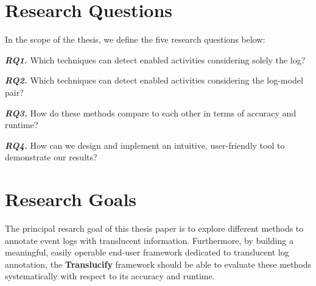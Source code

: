 \section{Research Questions}

\begin{comment}

In the context of our example, we can define many relevant research questions:
\begin{enumerate}
	\item What are typical prominent noise patterns in real event data?
	\item How to detect noise patterns in event data?
	\item How to detect infrequent behavior in event data?
	\item How to detect contextually different executions of the same activity?
	\item How to balance between detected noise patterns, infrequent behavior and imprecise labels?
	\item 
\end{enumerate}
Typically, your thesis consists of 3-5 research questions (often multiple more questions can be defined).
\end{comment}

In the scope of the thesis, we define the five research questions below: 

\textbf{\emph{RQ1.}} Which techniques can detect enabled activities considering solely the log?

\textbf{\emph{RQ2.}} Which techniques can detect enabled activities considering the log-model pair?

\textbf{\emph{RQ3.}} How do these methods compare to each other in terms of accuracy and runtime?

\textbf{\emph{RQ4.}} How can we design and implement an intuitive, user-friendly tool to demonstrate our results?


\section{Research Goals}

The principal resarch goal of this thesis paper is to explore different methods to annotate event logs with translucent information. Furthermore, by building a meaningful, easily operable end-user framework dedicated to translucent log annotation, the \textbf{Translucify} framework should be able to evaluate these methods systematically with respect to its accuracy and runtime. 

